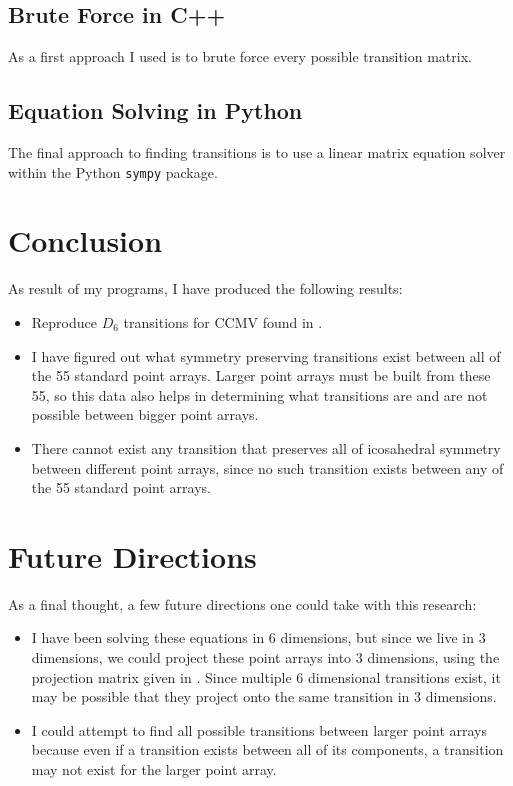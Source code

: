 \documentclass[a4paper,10pt]{article}
\theoremstyle{plain}
\theoremstyle{definition}
\theoremstyle{remark}
\begin{document}
\subsection{Brute Force in C++}
As a first approach I used is to brute force every possible transition matrix.

\subsection{Equation Solving in Python}
The final approach to finding transitions is to use a linear matrix equation solver within the Python \texttt{sympy} package.


\section{Conclusion}
As result of my programs, I have produced the following results:
\begin{itemize}
    \item Reproduce \(D_6\) transitions for CCMV found in \cite{indelicatoetal2012}.
    \item I have figured out what symmetry preserving transitions exist between all of the 55 standard point arrays. Larger point arrays must be built from these 55, so this data also helps in determining what transitions are and are not possible between bigger point arrays.
    \item There cannot exist any transition that preserves all of icosahedral symmetry between different point arrays, since no such transition exists between any of the 55 standard point arrays.
\end{itemize}

\section{Future Directions}
As a final thought, a few future directions one could take with this research:
\begin{itemize}
    \item I have been solving these equations in 6 dimensions, but since we live in 3 dimensions, we could project these point arrays into 3 dimensions, using the projection matrix given in \cite{indelicatoetal2012}.
    Since multiple 6 dimensional transitions exist, it may be possible that they project onto the same transition in 3 dimensions.
    \item I could attempt to find all possible transitions between larger point arrays because even if a transition exists between all of its components, a transition may not exist for the larger point array.
\end{itemize}

\medskip

\end{document}
